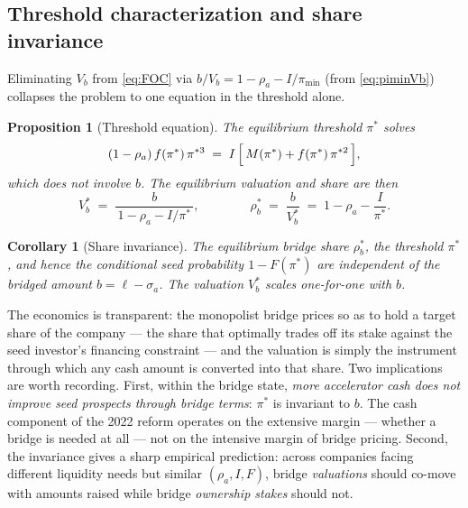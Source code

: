 \documentclass[11pt]{article}
\newtheorem{proposition}{Proposition}
\newtheorem{corollary}{Corollary}
\theoremstyle{definition}
\newcommand{\pimin}{\pi_{\min}}
\begin{document}
\subsection{Threshold characterization and share invariance}

Eliminating $V_b$ from \eqref{eq:FOC} via $b/V_b = 1-\rho_a-I/\pimin$ (from \eqref{eq:piminVb}) collapses the problem to one equation in the threshold alone.

\begin{proposition}[Threshold equation]\label{prop:threshold}
The equilibrium threshold $\pi^{*}$ solves
\begin{equation}
(1-\rho_a)\, f(\pi^{*})\,\pi^{*3}
\;=\;
I\,\Bigl[\,M(\pi^{*}) + f(\pi^{*})\,\pi^{*2}\,\Bigr],
\label{eq:thresholdeq}
\end{equation}
which does not involve $b$. The equilibrium valuation and share are then
\begin{equation}
V_b^{*} \;=\; \frac{b}{\,1-\rho_a - I/\pi^{*}\,},
\qquad\qquad
\rho_b^{*} \;=\; \frac{b}{V_b^{*}} \;=\; 1-\rho_a-\frac{I}{\pi^{*}} .
\label{eq:Vbstar}
\end{equation}
\end{proposition}

\begin{corollary}[Share invariance]\label{cor:invariance}
The equilibrium bridge share $\rho_b^{*}$, the threshold $\pi^{*}$, and hence the conditional seed probability $1-F(\pi^{*})$ are independent of the bridged amount $b = \ell-\sigma_a$. The valuation $V_b^{*}$ scales one-for-one with $b$.
\end{corollary}

The economics is transparent: the monopolist bridge prices so as to hold a target share of the company --- the share that optimally trades off its stake against the seed investor's financing constraint --- and the valuation is simply the instrument through which any cash amount is converted into that share. Two implications are worth recording. First, within the bridge state, \emph{more accelerator cash does not improve seed prospects through bridge terms}: $\pi^{*}$ is invariant to $b$. The cash component of the 2022 reform operates on the extensive margin --- whether a bridge is needed at all --- not on the intensive margin of bridge pricing. Second, the invariance gives a sharp empirical prediction: across companies facing different liquidity needs but similar $(\rho_a, I, F)$, bridge \emph{valuations} should co-move with amounts raised while bridge \emph{ownership stakes} should not.
\end{document}
